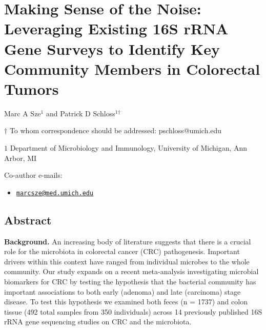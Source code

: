 \documentclass[12pt,]{article}
\title{}
\author{}
\date{}
\providecommand{\tightlist}{%
  \setlength{\itemsep}{0pt}\setlength{\parskip}{0pt}}
\begin{document}
\section{Making Sense of the Noise: Leveraging Existing 16S rRNA Gene
Surveys to Identify Key Community Members in Colorectal
Tumors}\label{making-sense-of-the-noise-leveraging-existing-16s-rrna-gene-surveys-to-identify-key-community-members-in-colorectal-tumors}

\begin{center}
\vspace{25mm}

Marc A Sze${^1}$ and Patrick D Schloss${^1}$${^\dagger}$

\vspace{20mm}

$\dagger$ To whom correspondence should be addressed: pschloss@umich.edu

$1$ Department of Microbiology and Immunology, University of Michigan, Ann Arbor, MI




\end{center}

Co-author e-mails:

\begin{itemize}
\tightlist
\item
  \href{mailto:marcsze@med.umich.edu}{\nolinkurl{marcsze@med.umich.edu}}
\end{itemize}

\newpage

\linenumbers

\subsection{Abstract}\label{abstract}

\textbf{Background.} An increasing body of literature suggests that
there is a crucial role for the microbiota in colorectal cancer (CRC)
pathogenesis. Important drivers within this context have ranged from
individual microbes to the whole community. Our study expands on a
recent meta-analysis investigating microbial biomarkers for CRC by
testing the hypothesis that the bacterial community has important
associations to both early (adenoma) and late (carcinoma) stage disease.
To test this hypothesis we examined both feces (n = 1737) and colon
tissue (492 total samples from 350 individuals) across 14 previously
published 16S rRNA gene sequencing studies on CRC and the microbiota.
\end{document}
